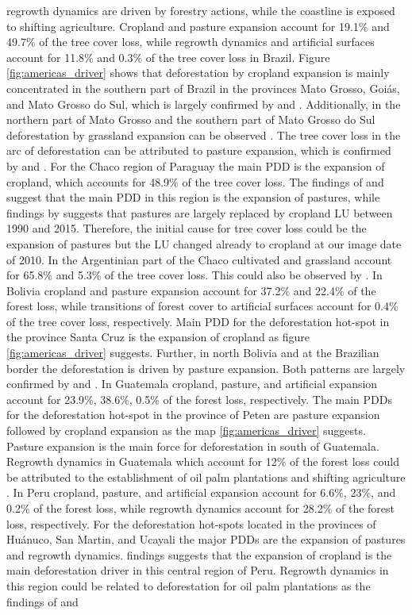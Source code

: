 regrowth dynamics are driven by forestry actions, while the coastline is exposed to shifting agriculture. Cropland and pasture expansion account for 19.1\% and 49.7\% of the tree cover loss, while regrowth dynamics and artificial surfaces account for 11.8\% and 0.3\% of the tree cover loss in Brazil. Figure \ref{fig:americas_driver} shows that deforestation by cropland expansion is mainly concentrated in the southern part of Brazil in the provinces Mato Grosso, Goi\'{a}s, and Mato Grosso do Sul, which is largely confirmed by \citet{Zalles2018} and \citet{Graesser2015}. Additionally, in the northern part of Mato Grosso and the southern part of Mato Grosso do Sul deforestation by grassland expansion can be observed \citep{Graesser2015,Sy2015}. The tree cover loss in the arc of deforestation can be attributed to pasture expansion, which is confirmed by \citet{Sy2015} and \citet{Graesser2015}. For the Chaco region of Paraguay the main \ac{PDD} is the expansion of cropland, which accounts for 48.9\% of the tree cover loss. The findings of \citet{Graesser2015} and \citet{Caldas2013} suggest that the main \ac{PDD} in this region is the expansion of pastures, while findings by \citet{Graesser2018} suggests that pastures are largely replaced by cropland \ac{LU} between 1990 and 2015. Therefore, the initial cause for tree cover loss could be the expansion of pastures but the \ac{LU} changed already to cropland at our image date of 2010. In the Argentinian part of the Chaco cultivated and grassland account for 65.8\% and 5.3\% of the tree cover loss. This could also be observed by \citet{Sy2015}. In Bolivia cropland and pasture expansion account for 37.2\% and 22.4\% of the forest loss, while transitions of forest cover to artificial surfaces account for 0.4\% of the tree cover loss, respectively. Main \ac{PDD} for the deforestation hot-spot in the province Santa Cruz is the expansion of cropland as figure \ref{fig:americas_driver} suggests. Further, in north Bolivia and at the Brazilian border the deforestation is driven by pasture expansion. Both patterns are largely confirmed by \citet{Graesser2015} and \citet{Sy2015}. In Guatemala cropland, pasture, and artificial expansion account for 23.9\%, 38.6\%, 0.5\% of the forest loss, respectively. The main \acp{PDD} for the deforestation hot-spot in the province of Peten are pasture expansion followed by cropland expansion as the map \ref{fig:americas_driver} suggests. Pasture expansion is the main force for deforestation in south of Guatemala. Regrowth dynamics in Guatemala which account for 12\% of the forest loss could be attributed to the establishment of oil palm plantations and shifting agriculture \citep{Furumo2017,Curtis2018}. In Peru cropland, pasture, and artificial expansion account for 6.6\%, 23\%, and 0.2\% of the forest loss, while regrowth dynamics account for 28.2\% of the forest loss, respectively. For the deforestation hot-spots located in the provinces of Huánuco, San Martin, and Ucayali the major \acp{PDD} are the expansion of pastures and regrowth dynamics. \citep{Sy2015} findings suggests that the expansion of cropland is the main deforestation driver in this central region of Peru. Regrowth dynamics in this region could be related to deforestation for oil palm plantations as the findings of \citet{Vijay2018} and 